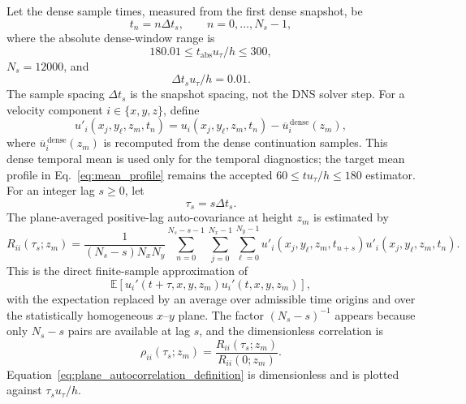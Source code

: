 \documentclass[11pt]{article}
\begin{document}
Let the dense sample times, measured from the first dense snapshot, be
\[
  t_n=n\Delta t_s,\qquad n=0,\ldots,N_s-1,
\]
where the absolute dense-window range is
\[
  180.01 \le t_{\mathrm{abs}}u_{\tau}/h \le 300,
\]
\(N_s=12000\), and
\[
  \Delta t_s u_{\tau}/h = 0.01.
\]
The sample spacing \(\Delta t_s\) is the snapshot spacing, not the DNS solver
step. For a velocity component \(i\in\{x,y,z\}\), define
\[
  u'_i(x_j,y_\ell,z_m,t_n)
  =
  u_i(x_j,y_\ell,z_m,t_n)-\overline{u}^{\,\mathrm{dense}}_i(z_m),
\]
where \(\overline{u}^{\,\mathrm{dense}}_i(z_m)\) is recomputed from the dense
continuation samples. This dense temporal mean is used only for the temporal
diagnostics; the target mean profile in Eq.~\eqref{eq:mean_profile} remains the
accepted \(60\le t u_{\tau}/h\le180\) estimator.
For an integer lag \(s\ge0\), let
\[
  \tau_s=s\Delta t_s.
\]
The plane-averaged positive-lag auto-covariance at height \(z_m\) is estimated
by
\begin{equation}
  R_{ii}(\tau_s;z_m)
  =
  \frac{1}{(N_s-s)N_xN_y}
  \sum_{n=0}^{N_s-s-1}
  \sum_{j=0}^{N_x-1}
  \sum_{\ell=0}^{N_y-1}
  u'_i(x_j,y_\ell,z_m,t_{n+s})
  u'_i(x_j,y_\ell,z_m,t_n).
  \label{eq:plane_autocovariance_estimator}
\end{equation}
This is the direct finite-sample approximation of
\[
  \mathbb{E}\left[
  u_i'(t+\tau,x,y,z_m)u_i'(t,x,y,z_m)
  \right],
\]
with the expectation replaced by an average over admissible time origins and
over the statistically homogeneous \(x\)--\(y\) plane. The factor
\((N_s-s)^{-1}\) appears because only \(N_s-s\) pairs are available at lag
\(s\), and the dimensionless correlation is
\begin{equation}
  \rho_{ii}(\tau_s;z_m)
  =
  \frac{R_{ii}(\tau_s;z_m)}{R_{ii}(0;z_m)}.
  \label{eq:plane_autocorrelation_definition}
\end{equation}
Equation~\eqref{eq:plane_autocorrelation_definition} is dimensionless and is
plotted against \(\tau_su_{\tau}/h\).
\end{document}
